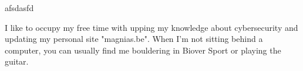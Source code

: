 
\begin{cventries}
  \cventry
	{afsdasfd}
\end{cventries}

I like to occupy my free time with upping my knowledge about cybersecurity and updating my personal site "magnias.be". When I'm not sitting behind a computer, you can usually find me bouldering in Biover Sport or playing the guitar.



